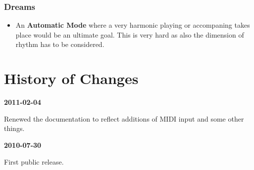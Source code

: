 \documentclass[12pt,a4paper,titlepage,oneside]{report}
\begin{document}
\subsection{Dreams}

\begin{itemize}

	\item An \textbf{Automatic Mode} where a very harmonic playing or accompaning takes place would be an ultimate goal. This is very hard as also the dimension of rhythm has to be considered.

\end{itemize}


\appendix
%

\chapter{History of Changes}
\label{chap:history}

\indent
\textbf{2011-02-04}

Renewed the documentation to reflect additions of MIDI input and some other things.

\textbf{2010-07-30}

First public release.


\clearpage
{}
{}



\nocite{*}

%
\end{document}
